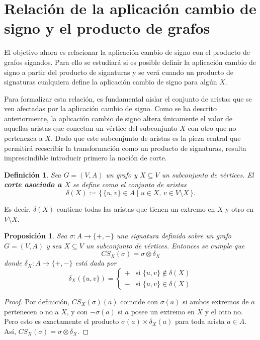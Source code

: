 \documentclass[11pt,a4paper,spanish]{report}
\theoremstyle{plain}
\newtheorem{proposicion}[teorema]{Proposición}
\newtheorem{definicion}{Definición}[chapter]
\begin{document}
\section{Relación de la aplicación cambio de signo y el producto de grafos}
 
El objetivo ahora es relacionar la aplicación cambio de signo con el producto de grafos signados. Para ello se estudiará si es posible definir la aplicación cambio de signo a partir del producto de signaturas y se verá cuando un producto de signaturas cualquiera define la aplicación cambio de signo para algún $X$.

Para formalizar esta relación, es fundamental aislar el conjunto de aristas que se ven afectadas por la aplicación cambio de signo. Como se ha descrito anteriormente, la aplicación cambio de signo altera únicamente el valor de aquellas aristas que conectan un vértice del subconjunto $X$ con otro que no pertenezca a $X$. Dado que este subconjunto de aristas es la pieza central que permitirá reescribir la transformación como un producto de signaturas, resulta imprescindible introducir primero la noción de corte.

\begin{definicion}\cite{zaslavsky1982signed}
Sea $G=(V,A)$ un grafo y $X \subseteq V$ un subconjunto de vértices. 
El \textbf{corte asociado a $X$} se define como el conjunto de aristas
\[
\delta(X) := \{\, \{u,v\} \in A \mid u \in X, \, v \in V \setminus X \,\}.
\]
\end{definicion}

Es decir, $\delta(X)$ contiene todas las aristas que tienen un extremo en $X$ y otro en $V \setminus X$.
\begin{proposicion}\label{signatura de corte}
Sea $\sigma \colon A \longrightarrow \{+,-\}$ una signatura definida sobre un grafo $G=(V,A)$ y sea $X \subseteq V$ un subconjunto de vértices. Entonces se cumple que
\[
CS_X(\sigma) = \sigma \otimes \delta_X
\]
donde $\delta_X \colon A \longrightarrow \{+,-\}$ está dada por
\[
\delta_X(\{u,v\}) = 
\begin{cases} 
+ & \text{si } \{u,v\} \notin \delta(X) \\ 
- & \text{si } \{u,v\} \in \delta(X) 
\end{cases}
\]
\end{proposicion}


\begin{proof}
Por definición, $CS_X(\sigma)(a)$ coincide con $\sigma(a)$ si ambos
extremos de $a$ pertenecen o no a $X$, y con $-\sigma(a)$ si $a$
posee un extremo en $X$ y el otro no. Pero esto es exactamente el producto
$\sigma(a)\times\delta_X(a)$ para toda arista $a\in A$. Así,
$CS_X(\sigma)=\sigma\otimes\delta_X$.
\end{proof}
\end{document}
